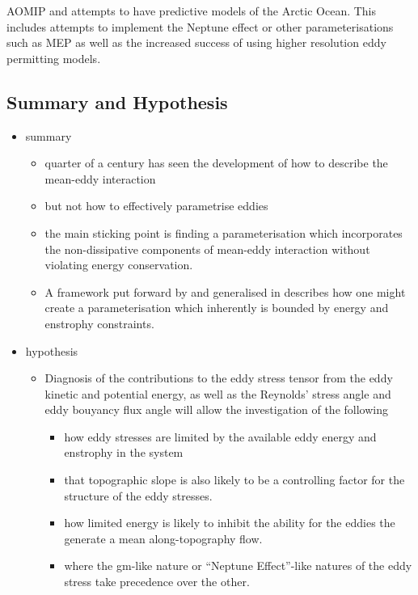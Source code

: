 \documentclass[10pt,a4paper]{article}
\begin{document}
AOMIP and attempts to have predictive models of the Arctic Ocean. This includes attempts
to implement the Neptune effect or other parameterisations such as MEP as well as
the increased success of using higher resolution eddy permitting models.

\subsection{Summary and Hypothesis}

\begin{itemize} 
	\item summary
	\begin{itemize} 
		\item quarter of a century has seen the development of how to describe the mean-eddy interaction
		\item but not how to effectively parametrise eddies
		\item the main sticking point is finding a parameterisation which incorporates the non-dissipative components of mean-eddy interaction without violating energy conservation.
		\item A framework put forward by \cite{marshall2012framework} and generalised in
		\cite{maddison2013eliassen} describes how one might create a parameterisation which
		inherently is bounded by energy and enstrophy constraints.
	\end{itemize}  
	\item hypothesis
	\begin{itemize} 
		\item Diagnosis of the contributions to the eddy stress tensor from
		the eddy kinetic and potential energy, as well as the Reynolds' stress angle and eddy bouyancy flux angle will allow the investigation of the following
		\begin{itemize} 
			\item how eddy stresses are limited by the available eddy energy and enstrophy in the system
			\item that topographic slope is also likely to be a controlling factor for the structure of the eddy stresses.
			\item how limited energy is likely to inhibit the ability for the eddies the
			generate a mean along-topography flow.
			\item where the \gls{gm}-like nature or ``Neptune Effect''-like natures of the 
			eddy stress take precedence over the other.
		\end{itemize} 
	\end{itemize} 
\end{itemize}      
 
\end{document}

